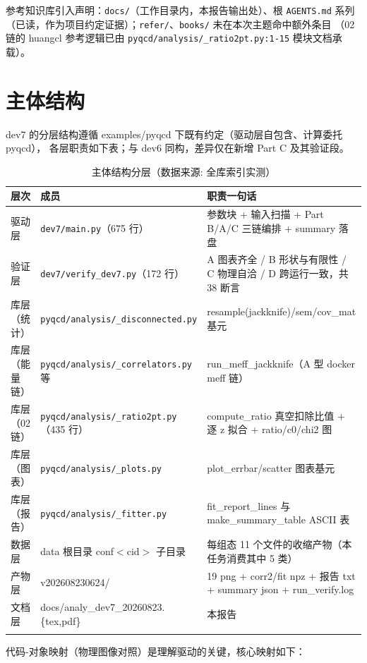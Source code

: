 \documentclass[UTF8]{ctexart}
\begin{document}
参考知识库引入声明：\texttt{docs/}（工作目录内，本报告输出处）、根 \texttt{AGENTS.md} 系列
（已读，作为项目约定证据）；\texttt{refer/}、\texttt{books/} 未在本次主题命中额外条目
（02 链的 huangcl 参考逻辑已由 \texttt{\nolinkurl{pyqcd/analysis/\_ratio2pt.py:1-15}} 模块文档承载）。

\section{主体结构}
dev7 的分层结构遵循 examples/pyqcd 下既有约定（驱动层自包含、计算委托 pyqcd），
各层职责如下表；与 dev6 同构，差异仅在新增 Part C 及其验证段。

\begin{xltabular}{\textwidth}{llX}
\toprule
\textcolor{struct}{层次} & 成员 & \textcolor{struct}{职责一句话} \\
\midrule
\endhead
驱动层 & \texttt{\nolinkurl{dev7/main.py}}（675 行） & 参数块 + 输入扫描 + Part B/A/C 三链编排 + summary 落盘 \\
验证层 & \texttt{\nolinkurl{dev7/verify\_dev7.py}}（172 行） & A 图表齐全 / B 形状与有限性 / C 物理自洽 / D 跨运行一致，共 38 断言 \\
库层（统计） & \texttt{\nolinkurl{pyqcd/analysis/\_disconnected.py}} & resample(jackknife)/sem/cov\_mat 基元 \\
库层（能量链） & \texttt{\nolinkurl{pyqcd/analysis/\_correlators.py}} 等 & run\_meff\_jackknife（A 型 docker meff 链） \\
库层（02 链） & \texttt{\nolinkurl{pyqcd/analysis/\_ratio2pt.py}}（435 行） & compute\_ratio 真空扣除比值 + 逐 z 拟合 + ratio/c0/chi2 图 \\
库层（图表） & \texttt{\nolinkurl{pyqcd/analysis/\_plots.py}} & plot\_errbar/scatter 图表基元 \\
库层（报告） & \texttt{\nolinkurl{pyqcd/analysis/\_fitter.py}} & fit\_report\_lines 与 make\_summary\_table ASCII 表 \\
数据层 & data 根目录 conf$<$cid$>$ 子目录 & 每组态 11 个文件的收缩产物（本任务消费其中 5 类） \\
产物层 & v202608230624/ & 19 png + corr2/fit npz + 报告 txt + summary json + run\_verify.log \\
文档层 & docs/analy\_dev7\_20260823.\{tex,pdf\} & 本报告 \\
\bottomrule
\caption{主体结构分层（数据来源: 全库索引实测）}
\end{xltabular}

代码-对象映射（物理图像对照）是理解驱动的关键，核心映射如下：
\end{document}
